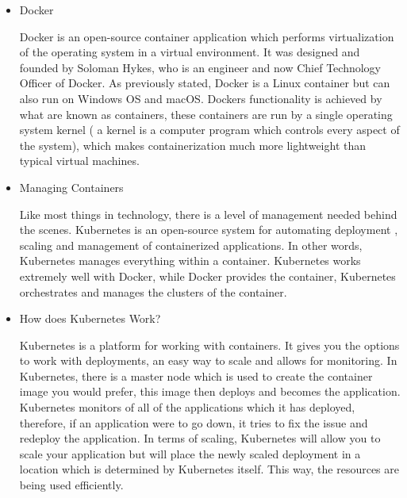 \begin{itemize}
    \item Docker
    
    Docker is an open-source container application which performs virtualization of the operating system in a virtual environment. It was designed and founded by Soloman Hykes, who is an engineer and now Chief Technology Officer of Docker. As previously stated, Docker is a Linux container but can also run on Windows OS and macOS. Dockers functionality is achieved by what are known as containers, these containers are run by a single operating system kernel ( a kernel is a computer program which controls every aspect of the system), which makes containerization much more lightweight than typical virtual machines.
    
    \item Managing Containers
    
    Like most things in technology, there is a level of management needed behind the scenes. Kubernetes is an open-source system for automating deployment , scaling and management of containerized applications. In other words, Kubernetes manages everything within a container. Kubernetes works extremely well with Docker, while Docker provides the container, Kubernetes orchestrates and manages the clusters of the container.  
    
    \item How does Kubernetes Work?
    
    Kubernetes is a platform for working with containers. It gives you the options to work with deployments, an easy way to scale and allows for monitoring. In Kubernetes, there is a master node which is used to create the container image you would prefer, this image then deploys and becomes the application. Kubernetes monitors of all of the applications which it has deployed, therefore, if an application were to go down, it tries to fix the issue and redeploy the application. In terms of scaling, Kubernetes will allow you to scale your application but will place the newly scaled deployment in a location which is determined by Kubernetes itself. This way, the resources are being used efficiently. 
    
\end{itemize}




